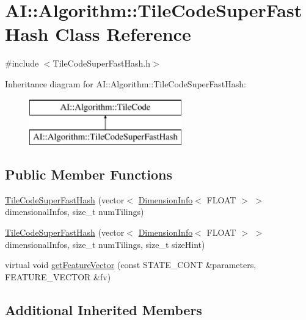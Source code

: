 \hypertarget{classAI_1_1Algorithm_1_1TileCodeSuperFastHash}{\section{A\-I\-:\-:Algorithm\-:\-:Tile\-Code\-Super\-Fast\-Hash Class Reference}
\label{classAI_1_1Algorithm_1_1TileCodeSuperFastHash}
}


{\ttfamily \#include $<$Tile\-Code\-Super\-Fast\-Hash.\-h$>$}

Inheritance diagram for A\-I\-:\-:Algorithm\-:\-:Tile\-Code\-Super\-Fast\-Hash\-:\begin{figure}[H]
\begin{center}
\leavevmode
\includegraphics[height=2.000000cm]{classAI_1_1Algorithm_1_1TileCodeSuperFastHash}
\end{center}
\end{figure}
\subsection*{Public Member Functions}
\begin{DoxyCompactItemize}
\item 
\hyperlink{classAI_1_1Algorithm_1_1TileCodeSuperFastHash_a7538ed36cf8ae0a15ff4c902a335266b}{Tile\-Code\-Super\-Fast\-Hash} (vector$<$ \hyperlink{classAI_1_1Algorithm_1_1DimensionInfo}{Dimension\-Info}$<$ F\-L\-O\-A\-T $>$ $>$ dimensional\-Infos, size\-\_\-t num\-Tilings)
\item 
\hyperlink{classAI_1_1Algorithm_1_1TileCodeSuperFastHash_a724f6d6f40f0f8f2e4d4692eb3f6c09f}{Tile\-Code\-Super\-Fast\-Hash} (vector$<$ \hyperlink{classAI_1_1Algorithm_1_1DimensionInfo}{Dimension\-Info}$<$ F\-L\-O\-A\-T $>$ $>$ dimensional\-Infos, size\-\_\-t num\-Tilings, size\-\_\-t size\-Hint)
\item 
virtual void \hyperlink{classAI_1_1Algorithm_1_1TileCodeSuperFastHash_a46f0df02799eb67bc8fb574b265e7e67}{get\-Feature\-Vector} (const S\-T\-A\-T\-E\-\_\-\-C\-O\-N\-T \&parameters, F\-E\-A\-T\-U\-R\-E\-\_\-\-V\-E\-C\-T\-O\-R \&fv)
\end{DoxyCompactItemize}
\subsection*{Additional Inherited Members}


